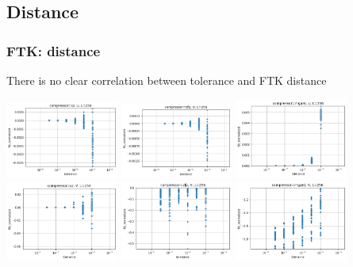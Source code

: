 \subsection{Distance}
\begin{frame}[fragile]
  \frametitle{FTK: distance}
  
  There is no clear correlation between tolerance and FTK distance
  
  \begin{center}
    \includegraphics[width=3.7cm]{graphs/ndistance_sz_U.png}
    \includegraphics[width=3.7cm]{graphs/ndistance_zfp_U.png}
    \includegraphics[width=3.7cm]{graphs/ndistance_mgard_U.png}
    \includegraphics[width=3.7cm]{graphs/ndistance_sz_V.png}
    \includegraphics[width=3.7cm]{graphs/ndistance_zfp_V.png}
    \includegraphics[width=3.7cm]{graphs/ndistance_mgard_V.png}    
  \end{center}
\end{frame}


